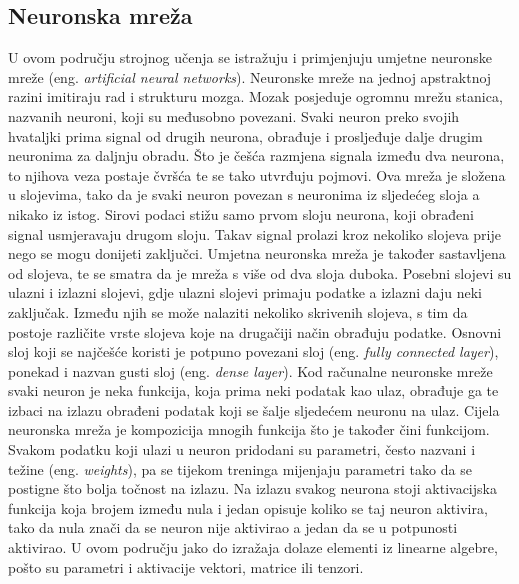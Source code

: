 \subsection{Neuronska mreža}
U ovom području strojnog učenja se istražuju i primjenjuju umjetne neuronske mreže (eng. \textit{artificial neural networks}). Neuronske mreže na jednoj apstraktnoj razini imitiraju rad i strukturu mozga. Mozak posjeduje ogromnu mrežu stanica, nazvanih neuroni, koji su međusobno povezani. Svaki neuron preko svojih hvataljki prima signal od drugih neurona, obrađuje i prosljeđuje dalje drugim neuronima za daljnju obradu. Što je češća razmjena signala između dva neurona, to njihova veza postaje čvršća te se tako utvrđuju pojmovi. Ova mreža je složena u slojevima, tako da je svaki neuron povezan s neuronima iz sljedećeg sloja a nikako iz istog. Sirovi podaci stižu samo prvom sloju neurona, koji obrađeni signal usmjeravaju drugom sloju. Takav signal prolazi kroz nekoliko slojeva prije nego se mogu donijeti zaključci. Umjetna neuronska mreža je također sastavljena od slojeva, te se smatra da je mreža s više od dva sloja duboka. Posebni slojevi su ulazni i izlazni slojevi, gdje ulazni slojevi primaju podatke a izlazni daju neki zaključak. Između njih se može nalaziti nekoliko skrivenih slojeva, s tim da postoje različite vrste slojeva koje na drugačiji način obrađuju podatke. Osnovni sloj koji se najčešće koristi je potpuno povezani sloj (eng. \textit{fully connected layer}), ponekad i nazvan gusti sloj (eng. \textit{dense layer}). Kod računalne neuronske mreže svaki neuron je neka funkcija, koja prima neki podatak kao ulaz, obrađuje ga te izbaci na izlazu obrađeni podatak koji se šalje sljedećem neuronu na ulaz. Cijela neuronska mreža je kompozicija mnogih funkcija što je također čini funkcijom. Svakom podatku koji ulazi u neuron pridodani su parametri, često nazvani i težine (eng. \textit{weights}), pa se tijekom treninga mijenjaju parametri tako da se postigne što bolja točnost na izlazu. Na izlazu svakog neurona stoji aktivacijska funkcija koja brojem između nula i jedan opisuje koliko se taj neuron aktivira, tako da nula znači da se neuron nije aktivirao a jedan da se u potpunosti aktivirao. U ovom području jako do izražaja dolaze elementi iz linearne algebre, pošto su parametri i aktivacije vektori, matrice ili tenzori. 

